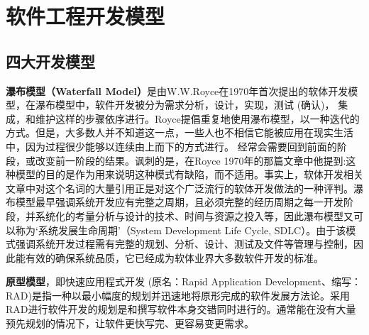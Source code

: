 \section{软件工程开发模型}

\subsection{四大开发模型}
\textbf{瀑布模型（Waterfall Model）}是由W.W.Royce在1970年首次提出的软体开发模型，在瀑布模型中，软件开发被分为需求分析，设计，实现，测试 (确认)， 集成，和维护这样的步骤依序进行。Royce提倡重复地使用瀑布模型，以一种迭代的方式。但是，大多数人并不知道这一点，一些人也不相信它能被应用在现实生活中，因为过程很少能够以连续由上而下的方式进行。 经常会需要回到前面的阶段，或改变前一阶段的结果。讽刺的是，在Royce 1970年的那篇文章中他提到:这种模型的目的是作为用来说明这种模式有缺陷，而不适用。事实上，软体开发相关文章中对这个名词的大量引用正是对这个广泛流行的软体开发做法的一种评判。瀑布模型最早强调系统开发应有完整之周期，且必须完整的经历周期之每一开发阶段，并系统化的考量分析与设计的技术、时间与资源之投入等，因此瀑布模型又可以称为‘系统发展生命周期’（System Development Life Cycle, SDLC）。由于该模式强调系统开发过程需有完整的规划、分析、设计、测试及文件等管理与控制，因此能有效的确保系统品质，它已经成为软体业界大多数软件开发的标准。

\textbf{原型模型}，即快速应用程式开发 (原名：Rapid Application Development、缩写：RAD)是指一种以最小幅度的规划并迅速地将原形完成的软件发展方法论。采用RAD进行软件开发的规划是和撰写软件本身交错同时进行的。通常能在没有大量预先规划的情况下，让软件更快写完、更容易变更需求。


